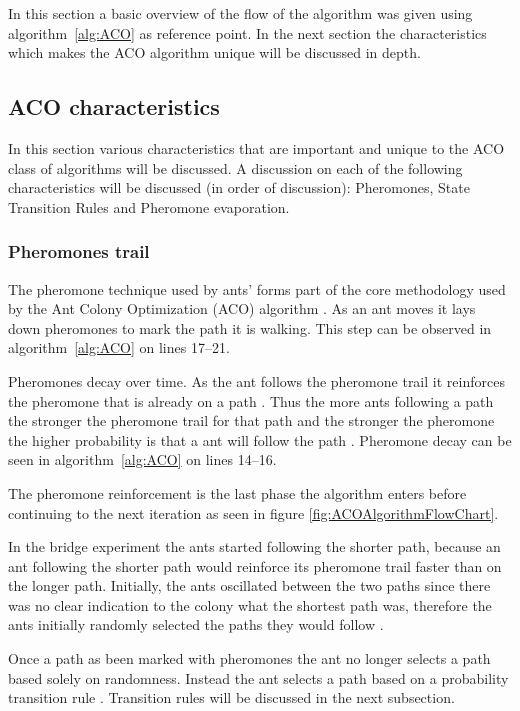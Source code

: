 In this section a basic overview of the flow of the algorithm was given using algorithm~\ref{alg:ACO} as reference point. In the next section the characteristics which makes the ACO algorithm unique will be discussed in depth.
\subsection{ACO characteristics}
\label{sec:ACOcharacter}
In this section various characteristics that are important and unique to the ACO class of algorithms will be discussed. A discussion on each of the following characteristics will be discussed (in order of discussion): Pheromones, State Transition Rules and Pheromone evaporation.
\subsubsection{Pheromones trail}
\label{sec:pheromonetrail}
The pheromone technique used by ants' forms part of the core methodology used by the Ant Colony Optimization (ACO) algorithm \cite{AntQAP}. As an ant moves it lays down pheromones to mark the path it is walking. This step can be observed in algorithm~\ref{alg:ACO} on lines 17--21.

Pheromones decay over time. As the ant follows the pheromone trail it reinforces the pheromone that is already on a path \cite{AntQAP}. Thus the more ants following a path the stronger the pheromone trail for that path and the stronger the pheromone the higher probability is that a ant will follow the path \cite{AntQAP}. Pheromone decay can be seen in algorithm~\ref{alg:ACO} on lines 14--16.

The pheromone reinforcement is the last phase the algorithm enters before continuing to the next iteration as seen in figure \ref{fig:ACOAlgorithmFlowChart}.

In the bridge experiment the ants started following the shorter path, because an ant following the shorter path would reinforce its pheromone trail faster than on the longer path. Initially, the ants oscillated between the two paths since there was no clear indication to the colony what the shortest path was, therefore the ants initially randomly selected the paths they would follow \cite{AntQAP}.

Once a path as been marked with pheromones the ant no longer selects a path based solely on randomness\cite{AntQAP,AntsAndStigmergy,CompuIntelligenceIntro}. Instead the ant selects a path based on a probability transition rule \cite{AntsAndStigmergy}. Transition rules will be discussed in the next subsection.

